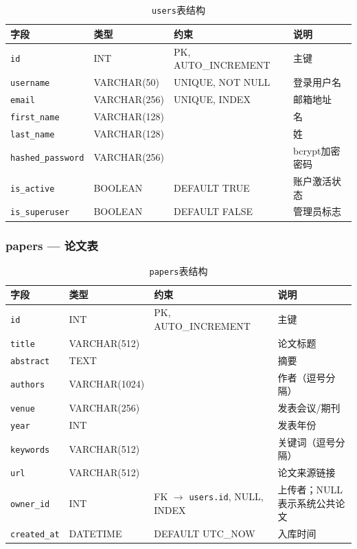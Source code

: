 \documentclass[12pt,a4paper]{ctexart}
\newcommand{\code}[1]{\texttt{#1}}
\begin{document}
\begin{table}[H]
\centering
\caption{\code{users}表结构}
\begin{tabular}{lllp{5cm}}
\toprule
\textbf{字段} & \textbf{类型} & \textbf{约束} & \textbf{说明} \\
\midrule
\code{id}              & INT          & PK, AUTO\_INCREMENT & 主键 \\
\code{username}        & VARCHAR(50)  & UNIQUE, NOT NULL    & 登录用户名 \\
\code{email}           & VARCHAR(256) & UNIQUE, INDEX       & 邮箱地址 \\
\code{first\_name}     & VARCHAR(128) &                     & 名 \\
\code{last\_name}      & VARCHAR(128) &                     & 姓 \\
\code{hashed\_password}& VARCHAR(256) &                     & bcrypt加密密码 \\
\code{is\_active}      & BOOLEAN      & DEFAULT TRUE        & 账户激活状态 \\
\code{is\_superuser}   & BOOLEAN      & DEFAULT FALSE       & 管理员标志 \\
\bottomrule
\end{tabular}
\end{table}

\subsubsection{papers — 论文表}

\begin{table}[H]
\centering
\caption{\code{papers}表结构}
\begin{tabular}{lllp{5cm}}
\toprule
\textbf{字段} & \textbf{类型} & \textbf{约束} & \textbf{说明} \\
\midrule
\code{id}          & INT            & PK, AUTO\_INCREMENT & 主键 \\
\code{title}       & VARCHAR(512)   &                     & 论文标题 \\
\code{abstract}    & TEXT           &                     & 摘要 \\
\code{authors}     & VARCHAR(1024)  &                     & 作者（逗号分隔）\\
\code{venue}       & VARCHAR(256)   &                     & 发表会议/期刊 \\
\code{year}        & INT            &                     & 发表年份 \\
\code{keywords}    & VARCHAR(512)   &                     & 关键词（逗号分隔）\\
\code{url}         & VARCHAR(512)   &                     & 论文来源链接 \\
\code{owner\_id}   & INT            & FK $\to$ \code{users.id}, NULL, INDEX & 上传者；NULL表示系统公共论文 \\
\code{created\_at} & DATETIME       & DEFAULT UTC\_NOW    & 入库时间 \\
\bottomrule
\end{tabular}
\end{table}
\end{document}

